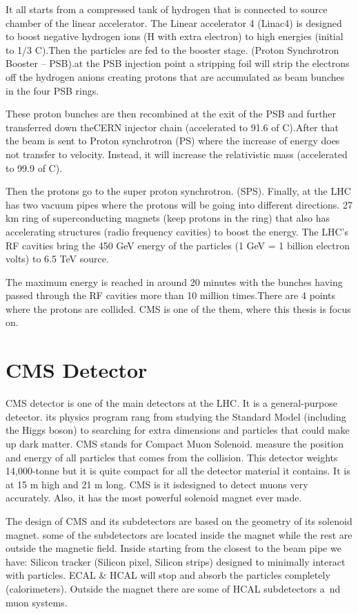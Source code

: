 It all starts from a compressed tank of hydrogen that is connected to source chamber of the linear accelerator.
The Linear accelerator 4 (Linac4) is designed to boost negative hydrogen ions (H with extra electron) to high energies (initial to 1/3 C).Then the particles are fed to the booster stage. (Proton Synchrotron Booster – PSB).at the PSB injection point a stripping foil will strip the electrons off the hydrogen anions creating protons that are accumulated as beam bunches in the four PSB rings.

These proton bunches are then recombined at the exit of the PSB and further transferred down theCERN injector chain (accelerated to 91.6 of C).After that the beam is sent to Proton synchrotron (PS) where the increase of energy does not transfer to velocity.
Instead, it will increase the relativistic mass (accelerated to 99.9 of C).

Then the protons go to the super proton synchrotron. (SPS). Finally, at the LHC has two vacuum pipes where the protons will be going into different directions. 27 km ring of superconducting magnets (keep protons in the ring) that also has  accelerating structures (radio frequency cavities) to boost the energy. The LHC’s RF cavities bring the 450 GeV energy  of the particles (1 GeV = 1 billion electron volts) to 6.5 TeV source.

The maximum energy is reached in around 20 minutes with the bunches having passed through the RF cavities more than 10 million times.There are 4 points where the protons are collided. CMS is one of the them, where this thesis is focus on.

\section{CMS Detector}

CMS detector is one of the main detectors at the LHC. It is a general-purpose detector. its physics program rang from studying the Standard Model (including the Higgs boson) to searching for extra dimensions and particles that could make up dark matter.
CMS stands for Compact Muon Solenoid. measure the position and energy of all particles that comes from the collision. This detector weights 14,000-tonne but it is quite compact for all the detector material it contains. It is at 15 m high  and 21 m long.
CMS is it isdesigned to detect muons very accurately. Also, it has the most powerful solenoid magnet ever made.

The design of CMS and its subdetectors are based on the geometry of its solenoid magnet. some of the subdetectors are located inside the magnet while the rest are outside the magnetic field. Inside starting from the closest to the beam pipe we have: Silicon tracker (Silicon pixel, Silicon strips) designed to minimally interact with particles. ECAL & HCAL will stop and absorb the particles completely (calorimeters).  Outside the magnet there are some of HCAL subdetectors a\
nd muon systems.


